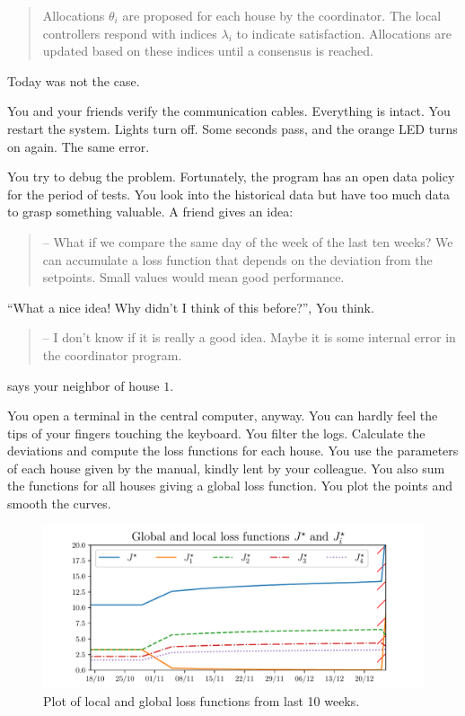 \documentclass[../main.tex]{subfiles}
\begin{document}
\begin{quote}
  \raggedright
  Allocations $\theta_{i}$ are proposed for each house by the coordinator.
  The local controllers respond with indices $\lambda_{i}$ to indicate satisfaction. Allocations are updated based on these indices until a consensus is reached.
\end{quote}
Today was not the case.

You and your friends verify the communication cables.
Everything is intact. You restart the system.
Lights turn off. Some seconds pass, and the orange LED turns on again.
The same error.

You try to debug the problem.
Fortunately, the program has an open data policy for the period of tests.
You look into the historical data but have too much data to grasp something valuable.
A friend gives an idea:
\begin{quote}
  -- What if we compare the same day of the week of the last ten weeks? We can accumulate a loss function that depends on the deviation from the setpoints.
  Small values would mean good performance.
\end{quote}

``What a nice idea! Why didn't I think of this before?'', You think.
\begin{quote}
-- I don't know if it is really a good idea. Maybe it is some internal error in the coordinator program.
\end{quote}
says your neighbor of house $1$.

You open a terminal in the central computer, anyway.
You can hardly feel the tips of your fingers touching the keyboard.
You filter the logs. Calculate the deviations and compute the loss functions for each house. You use the parameters of each house given by the manual, kindly lent by your colleague.
You also sum the functions for all houses giving a global loss function.
You plot the points and smooth the curves.
\begin{figure}[H]
  \centering
  \includegraphics[width=.8\textwidth]{../img/example_introduction/example_J.pdf}
  \caption{Plot of local and global loss functions from last 10 weeks.}\label{fig:change_in_j}
\end{figure}
\end{document}
